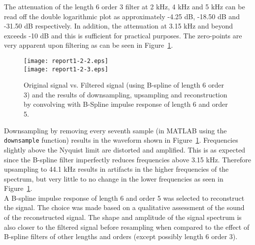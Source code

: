 The attenuation of the length 6 order 3 filter at 2 kHz, 4 kHz and 5 kHz can be read off the double logarithmic plot as approximately -4.25 dB, -18.50 dB and -31.50 dB respectively. In addition, the attenuation at 3.15 kHz and beyond exceeds -10 dB and this is sufficient for practical purposes. The zero-points are very apparent upon filtering as can be seen in Figure~\ref{fig:FilteredSpokenSentence}.\\

\begin{figure}[H]
\center
\texttt{[image: report1-2-2.eps]}\\
\texttt{[image: report1-2-3.eps]}
\caption{Original signal vs. Filtered signal (using B-spline of length 6 order 3) and the results of downsampling, upsampling and reconstruction by convolving with B-Spline impulse response of length 6 and order 5.}
\label{fig:FilteredSpokenSentence}
\end{figure}

Downsampling by removing every seventh sample (in MATLAB using the \texttt{downsample} function) results in the waveform shown in Figure~\ref{fig:FilteredSpokenSentence}. Frequencies slightly above the Nyquist limit are distorted and amplified. This is as expected since the B-spline filter imperfectly reduces frequencies above 3.15 kHz. Therefore upsampling to 44.1 kHz results in artifacts in the higher frequencies of the spectrum, but very little to no change in the lower frequencies as seen in Figure~\ref{fig:FilteredSpokenSentence}. \\

A B-spline impulse response of length 6 and order 5 was selected to reconstruct the signal. The choice was made based on a qualitative assessment of the sound of the reconstructed signal. The shape and amplitude of the signal spectrum is also closer to the filtered signal before resampling when compared to the effect of B-spline filters of other lengths and orders (except possibly length 6 order 3).
